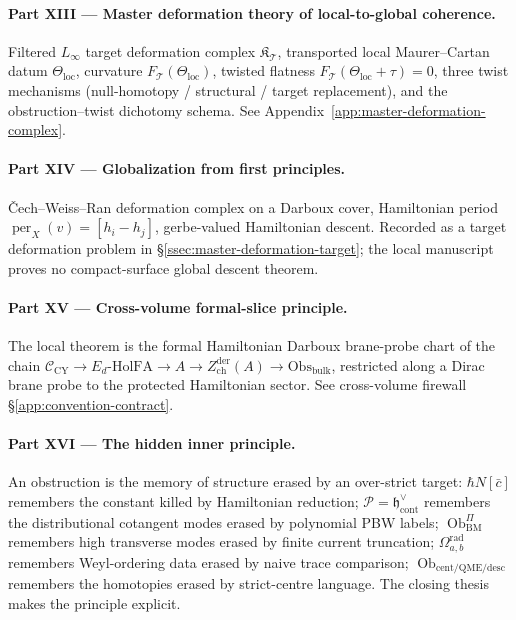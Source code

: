 \paragraph{Part XIII --- Master deformation theory of local-to-global coherence.}
Filtered \(L_\infty\) target deformation complex
\(\mathfrak K_{\mathcal T}\), transported local Maurer--Cartan datum
\(\Theta_{\mathrm{loc}}\), curvature \(F_{\mathcal T}(\Theta_{\mathrm{loc}})\),
twisted flatness \(F_{\mathcal T}(\Theta_{\mathrm{loc}}+\tau)=0\),
three twist mechanisms (null-homotopy / structural / target
replacement), and the obstruction--twist dichotomy schema.  See
Appendix~\ref{app:master-deformation-complex}.

\paragraph{Part XIV --- Globalization from first principles.}
\v{C}ech--Weiss--Ran deformation complex on a Darboux cover,
Hamiltonian period \(\operatorname{per}_X(v)=[h_i-h_j]\), gerbe-valued
Hamiltonian descent.  Recorded as a target deformation problem in
\S\ref{ssec:master-deformation-target}; the local manuscript proves
no compact-surface global descent theorem.

\paragraph{Part XV --- Cross-volume formal-slice principle.}  The
local theorem is the formal Hamiltonian Darboux brane-probe chart of
the chain
\(\mathcal C_{\mathrm{CY}}\to E_d\text{-HolFA}\to A\to
Z^{\mathrm{der}}_{\mathrm{ch}}(A)\to\mathrm{Obs}_{\mathrm{bulk}}\),
restricted along a Dirac brane probe to the protected Hamiltonian
sector.  See cross-volume firewall
\S\ref{app:convention-contract}.

\paragraph{Part XVI --- The hidden inner principle.}  An obstruction
is the memory of structure erased by an over-strict target:
\(\hbar N[\bar c]\) remembers the constant killed by Hamiltonian
reduction; \(\mathcal P=\mathfrak h^\vee_{\mathrm{cont}}\) remembers
the distributional cotangent modes erased by polynomial PBW labels;
\(\operatorname{Ob}^{\Pi}_{\mathrm{BM}}\) remembers high transverse
modes erased by finite current truncation; \(\Omega^{\mathrm{rad}}_{a,b}\)
remembers Weyl-ordering data erased by naive trace comparison;
\(\operatorname{Ob}_{\mathrm{cent/QME/desc}}\) remembers the
homotopies erased by strict-centre language.  The closing thesis
makes the principle explicit.
